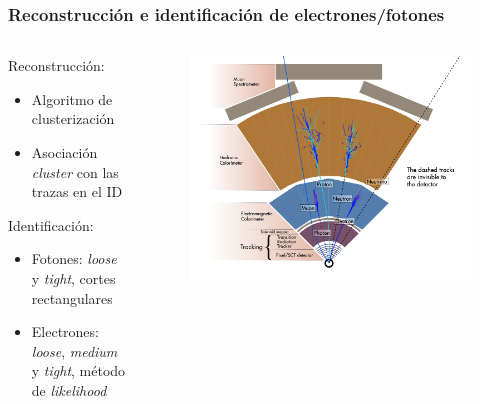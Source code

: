 \documentclass[10pt, compress,spanish]{beamer}
\begin{document}


\begin{frame}[fragile]

\frametitle{Reconstrucción e identificación de electrones/fotones}

\normalsize

\begin{columns}
\begin{column}{0.4\textwidth}
\begin{block}{Reconstrucción:}
\begin{itemize}

\item Algoritmo de clusterización

\item Asociación \textit{cluster} con las trazas en el ID

\end{itemize}
\end{block}

\begin{block}{Identificación:}
\begin{itemize}

\item Fotones: \textit{loose} y \textit{tight}, cortes rectangulares

\item Electrones: \textit{loose}, \textit{medium} y \textit{tight}, método de \textit{likelihood}

\end{itemize}
\end{block}
\end{column}

\begin{column}{0.6\textwidth}
\begin{figure}
\centering
\includegraphics[width=1.15\textwidth]{cross_section_2-eps-converted-to.pdf}
\end{figure}
\end{column}


\end{columns}
\end{frame}
\end{document}
